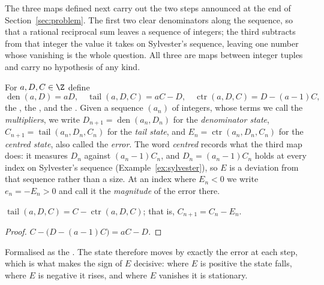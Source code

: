 \documentclass[11pt]{article}
\newcommand{\den}{\operatorname{den}}
\newcommand{\tail}{\operatorname{tail}}
\newcommand{\ctr}{\operatorname{ctr}}
\begin{document}
The three maps defined next carry out the two steps announced at the end of
Section~\ref{sec:problem}.  The first two clear denominators along the
sequence, so that a rational reciprocal sum leaves a sequence of integers; the
third subtracts from that integer the value it takes on Sylvester's sequence,
leaving one number whose vanishing is the whole question.  All three are maps
between integer tuples and carry no hypothesis of any kind.

For $a,D,C\in\Z$ define
\[
 \den(a,D)=aD,
 \quad
 \tail(a,D,C)=aC-D,
 \quad
 \ctr(a,D,C)=D-(a-1)C ,
\]
the
, the
,
and the
.
Given a sequence $(a_n)$ of integers, whose terms we call the
\emph{multipliers}, we write $D_{n+1}=\den(a_n,D_n)$ for the \emph{denominator
state}, $C_{n+1}=\tail(a_n,D_n,C_n)$ for the \emph{tail state}, and
$E_n=\ctr(a_n,D_n,C_n)$ for the \emph{centred state}, also called the
\emph{error}.  The word \emph{centred} records what the third map does: it
measures $D_n$ against $(a_n-1)C_n$, and $D_n=(a_n-1)C_n$ holds at every index
on Sylvester's sequence (Example~\ref{ex:sylvester}), so $E$ is a deviation
from that sequence rather than a size.  At an index where $E_n<0$ we write
$e_n=-E_n>0$ and call it the \emph{magnitude} of the error there.

\begin{proposition}\label{res:update}
$\tail(a,D,C)=C-\ctr(a,D,C)$; that is, $C_{n+1}=C_n-E_n$.
\end{proposition}

\begin{proof}
$C-\bigl(D-(a-1)C\bigr)=aC-D$.
\end{proof}

\noindent Formalised as the
.  The state therefore moves by exactly the error at each step, which is
what makes the sign of $E$ decisive: where $E$ is positive the state falls,
where $E$ is negative it rises, and where $E$ vanishes it is stationary.
\end{document}
